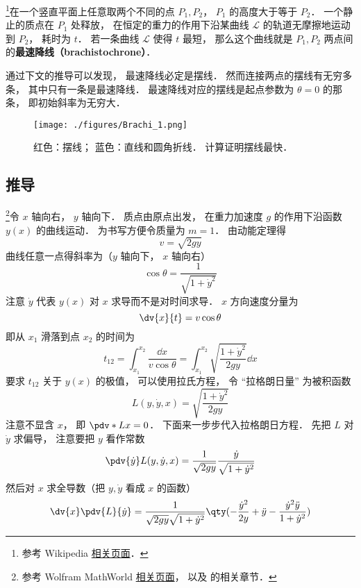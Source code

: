

\footnote{参考 Wikipedia \href{https://en.wikipedia.org/wiki/Brachistochrone_curve}{相关页面}．}在一个竖直平面上任意取两个不同的点 $P_1, P_2$， $P_1$ 的高度大于等于 $P_2$． 一个静止的质点在 $P_1$ 处释放， 在恒定的重力的作用下沿某曲线 $\mathcal L$ 的轨道无摩擦地运动到 $P_2$， 耗时为 $t$． 若一条曲线 $\mathcal L$ 使得 $t$ 最短， 那么这个曲线就是 $P_1, P_2$ 两点间的\textbf{最速降线（brachistochrone）}．

通过下文的推导可以发现， 最速降线必定是摆线． 然而连接两点的摆线有无穷多条， 其中只有一条是最速降线． 最速降线对应的摆线是起点参数为 $\theta = 0$ 的那条， 即初始斜率为无穷大．

\begin{figure}[ht]
\centering
\texttt{[image: ./figures/Brachi\_1.png]}
\caption{红色：摆线； 蓝色：直线和圆角折线． 计算证明摆线最快．} \label{Brachi_fig1}
\end{figure}

\subsection{推导}
\footnote{参考 Wolfram MathWorld \href{https://mathworld.wolfram.com/BrachistochroneProblem.html}{相关页面}， 以及 \cite{Goldstein} 的相关章节．}令 $x$ 轴向右， $y$ 轴向下． 质点由原点出发， 在重力加速度 $g$ 的作用下沿函数 $y(x)$ 的曲线运动． 为书写方便令质量为 $m = 1$． 由动能定理得
\begin{equation}
v = \sqrt{2gy}
\end{equation}
曲线任意一点得斜率为（$y$ 轴向下， $x$ 轴向右）
\begin{equation}
\cos\theta = \frac{1}{\sqrt{1 + \dot{y}^2}}
\end{equation}
注意 $\dot{y}$ 代表 $y(x)$ 对 $x$ 求导而不是对时间求导． $x$ 方向速度分量为
\begin{equation}
\dv{x}{t} = v\cos\theta
\end{equation}
即从 $x_1$ 滑落到点 $x_2$ 的时间为
\begin{equation}\label{Brachi_eq3}
t_{12} = \int_{x_1}^{x_2} \frac{\dd{x}}{v\cos\theta} = \int_{x_1}^{x_2} \sqrt{\frac{1 + \dot{y}^2}{2gy}} \dd{x}
\end{equation}
要求 $t_{12}$ 关于 $y(x)$ 的极值， 可以使用拉氏方程， 令 “拉格朗日量” 为被积函数
\begin{equation}
L(y, \dot y, x) = \sqrt{\frac{1 + \dot{y}^2}{2gy}}
\end{equation}
注意不显含 $x$， 即 $\pdv*{L}{x} = 0$． 下面来一步步代入拉格朗日方程． 先把 $L$ 对 $\dot{y}$ 求偏导， 注意要把 $y$ 看作常数
\begin{equation}
\pdv{\dot{y}}L(y, \dot{y}, x) = \frac{1}{\sqrt{2gy}}\frac{\dot{y}}{\sqrt{1 + \dot{y}^2}}
\end{equation}
然后对 $x$ 求全导数（把 $y, \dot{y}$ 看成 $x$ 的函数）
\begin{equation}
\dv{x}\pdv{L}{\dot{y}} = \frac{1}{\sqrt{2gy}\sqrt{1+\dot y^2}} \qty(-\frac{\dot y^2}{2y} + \ddot y - \frac{\dot y^2 \ddot y}{1 + \dot y^2})
\end{equation}

